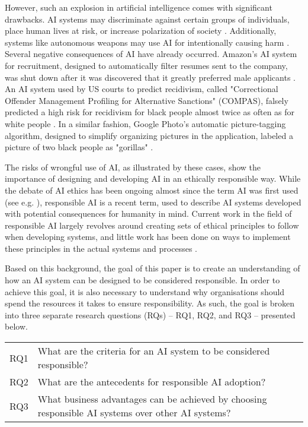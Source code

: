 However, such an explosion in artificial intelligence comes with significant drawbacks. AI systems may discriminate against certain groups of individuals, place human lives at risk, or increase polarization of society \parencite{Mikalef_2022}. Additionally, systems like autonomous weapons may use AI for intentionally causing harm \parencite{Eitel-Porter_2021}. Several negative consequences of AI have already occurred. Amazon's AI system for recruitment, designed to automatically filter resumes sent to the company, was shut down after it was discovered that it greatly preferred male applicants \parencite{Amazon_case_intro}. An AI system used by US courts to predict recidivism, called "Correctional Offender Management Profiling for Alternative Sanctions" (COMPAS), falsely predicted a high risk for recidivism for black people almost twice as often as for white people \parencite{COMPAS_2016_intro}.  In a similar fashion, Google Photo's automatic picture-tagging algorithm, designed to simplify organizing pictures in the application, labeled a picture of two black people as "gorillas" \parencite{Google_case_intro}.

The risks of wrongful use of AI, as illustrated by these cases, show the importance of designing and developing AI in an ethically responsible way. While the debate of AI ethics has been ongoing almost since the term AI was first used (see e.g. \cite{Wiener_1960,Samuel_1960}), responsible AI is a recent term, used to describe AI systems developed with potential consequences for humanity in mind. Current work in the field of responsible AI largely revolves around creating sets of ethical principles to follow when developing systems, and little work has been done on ways to implement these principles in the actual systems and processes \parencite{BarredoArrieta_2020}.

Based on this background, the goal of this paper is to create an understanding of how an AI system can be designed to be considered responsible. In order to achieve this goal, it is also necessary to understand why organisations should spend the resources it takes to ensure responsibility. As such, the goal is broken into three separate research questions (RQs) -- RQ1, RQ2, and RQ3 -- presented below.

\begin{table}[h]
    \centering
    \begin{tabular}{cp{}}
        RQ1 & What are the criteria for an AI system to be considered responsible? \\
        RQ2 & What are the antecedents for responsible AI adoption? \\
        RQ3 & What business advantages can be achieved by choosing responsible AI systems over other AI systems? \\
    \end{tabular}
\end{table}

